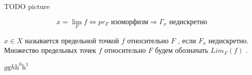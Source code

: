 \SSsect 

TODO picture

\[ x = \lim_{F} f \Leftrightarrow pr_F \mbox{~изоморфизм} \Rightarrow \Gamma_x \mbox{~недискретно} \]

\SSsect[def] \( x \in X \) называется предельной точкой \( f \) относительно \( F \) , если \( F_x \) недискретно. Множество предельных точек \( f \) относительно \( F \) будем обозначать \( Lim_F(f) \) .

\SSsect 

\( g \mathrm{g} h \mathrm{h}^0 \mathrm{h}^1 \)

\pagebreak

\SSbullet 

\pagebreak

\SSbullet 

\pagebreak

\SSbullet 


